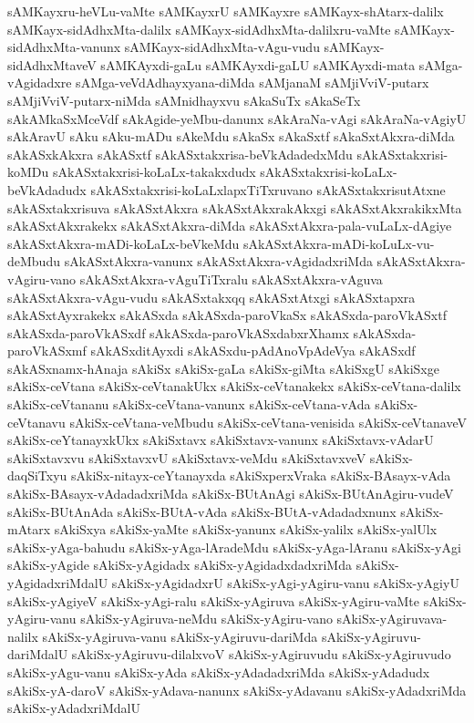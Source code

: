 {sAMKayxru-heVLu-vaMte
sAMKayxrU
sAMKayxre
sAMKayx-shAtarx-dalilx
sAMKayx-sidAdhxMta-dalilx
sAMKayx-sidAdhxMta-dalilxru-vaMte
sAMKayx-sidAdhxMta-vanunx
sAMKayx-sidAdhxMta-vAgu-vudu
sAMKayx-sidAdhxMtaveV
sAMKAyxdi-gaLu
sAMKAyxdi-gaLU
sAMKAyxdi-mata
sAMga-vAgidadxre
sAMga-veVdAdhayxyana-diMda
sAMjanaM
sAMjiVviV-putarx
sAMjiVviV-putarx-niMda
sAMnidhayxvu
sAkaSuTx
sAkaSeTx
sAkAMkaSxMceVdf
sAkAgide-yeMbu-danunx
sAkAraNa-vAgi
sAkAraNa-vAgiyU
sAkAravU
sAku
sAku-mADu
sAkeMdu
sAkaSx
sAkaSxtf
sAkaSxtAkxra-diMda
sAkASxkAkxra
sAkASxtf
sAkASxtakxrisa-beVkAdadedxMdu
sAkASxtakxrisi-koMDu
sAkASxtakxrisi-koLaLx-takakxdudx
sAkASxtakxrisi-koLaLx-beVkAdadudx
sAkASxtakxrisi-koLaLxlapxTiTxruvano
sAkASxtakxrisutAtxne
sAkASxtakxrisuva
sAkASxtAkxra
sAkASxtAkxrakAkxgi
sAkASxtAkxrakikxMta
sAkASxtAkxrakekx
sAkASxtAkxra-diMda
sAkASxtAkxra-pala-vuLaLx-dAgiye
sAkASxtAkxra-mADi-koLaLx-beVkeMdu
sAkASxtAkxra-mADi-koLuLx-vu-deMbudu
sAkASxtAkxra-vanunx
sAkASxtAkxra-vAgidadxriMda
sAkASxtAkxra-vAgiru-vano
sAkASxtAkxra-vAguTiTxralu
sAkASxtAkxra-vAguva
sAkASxtAkxra-vAgu-vudu
sAkASxtakxqq
sAkASxtAtxgi
sAkASxtapxra
sAkASxtAyxrakekx
sAkASxda
sAkASxda-paroVkaSx
sAkASxda-paroVkASxtf
sAkASxda-paroVkASxdf
sAkASxda-paroVkASxdabxrXhamx
sAkASxda-paroVkASxmf
sAkASxditAyxdi
sAkASxdu-pAdAnoVpAdeVya
sAkASxdf
sAkASxnamx-hAnaja
sAkiSx
sAkiSx-gaLa
sAkiSx-giMta
sAkiSxgU
sAkiSxge
sAkiSx-ceVtana
sAkiSx-ceVtanakUkx
sAkiSx-ceVtanakekx
sAkiSx-ceVtana-dalilx
sAkiSx-ceVtananu
sAkiSx-ceVtana-vanunx
sAkiSx-ceVtana-vAda
sAkiSx-ceVtanavu
sAkiSx-ceVtana-veMbudu
sAkiSx-ceVtana-venisida
sAkiSx-ceVtanaveV
sAkiSx-ceYtanayxkUkx
sAkiSxtavx
sAkiSxtavx-vanunx
sAkiSxtavx-vAdarU
sAkiSxtavxvu
sAkiSxtavxvU
sAkiSxtavx-veMdu
sAkiSxtavxveV
sAkiSx-daqSiTxyu
sAkiSx-nitayx-ceYtanayxda
sAkiSxperxVraka
sAkiSx-BAsayx-vAda
sAkiSx-BAsayx-vAdadadxriMda
sAkiSx-BUtAnAgi
sAkiSx-BUtAnAgiru-vudeV
sAkiSx-BUtAnAda
sAkiSx-BUtA-vAda
sAkiSx-BUtA-vAdadadxnunx
sAkiSx-mAtarx
sAkiSxya
sAkiSx-yaMte
sAkiSx-yanunx
sAkiSx-yalilx
sAkiSx-yalUlx
sAkiSx-yAga-bahudu
sAkiSx-yAga-lAradeMdu
sAkiSx-yAga-lAranu
sAkiSx-yAgi
sAkiSx-yAgide
sAkiSx-yAgidadx
sAkiSx-yAgidadxdadxriMda
sAkiSx-yAgidadxriMdalU
sAkiSx-yAgidadxrU
sAkiSx-yAgi-yAgiru-vanu
sAkiSx-yAgiyU
sAkiSx-yAgiyeV
sAkiSx-yAgi-ralu
sAkiSx-yAgiruva
sAkiSx-yAgiru-vaMte
sAkiSx-yAgiru-vanu
sAkiSx-yAgiruva-neMdu
sAkiSx-yAgiru-vano
sAkiSx-yAgiruvava-nalilx
sAkiSx-yAgiruva-vanu
sAkiSx-yAgiruvu-dariMda
sAkiSx-yAgiruvu-dariMdalU
sAkiSx-yAgiruvu-dilalxvoV
sAkiSx-yAgiruvudu
sAkiSx-yAgiruvudo
sAkiSx-yAgu-vanu
sAkiSx-yAda
sAkiSx-yAdadadxriMda
sAkiSx-yAdadudx
sAkiSx-yA-daroV
sAkiSx-yAdava-nanunx
sAkiSx-yAdavanu
sAkiSx-yAdadxriMda
sAkiSx-yAdadxriMdalU
}
